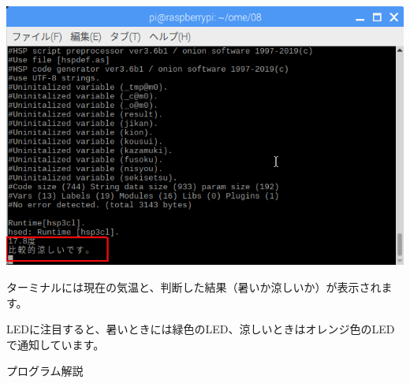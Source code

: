\documentclass[a4paper,12pt,dvipdfmx]{jarticle}
\begin{document}
\begin{center}
\includegraphics[width=17.006cm]{textbook-img039.png}

\end{center}
ターミナルには現在の気温と、判断した結果（暑いか涼しいか）が表示されます。

LEDに注目すると、暑いときには緑色のLED、涼しいときはオレンジ色のLEDで通知しています。


\bigskip


\bigskip

\clearpage
プログラム解説
\end{document}
